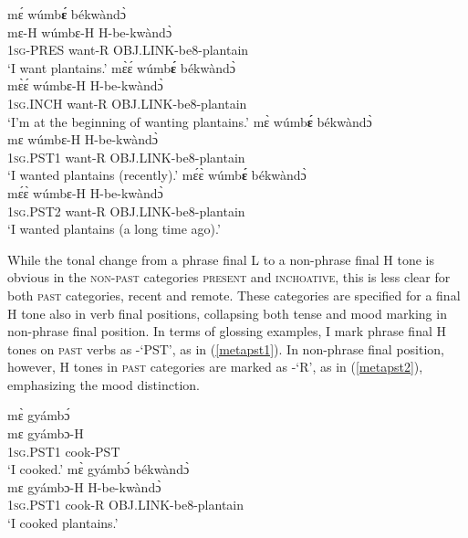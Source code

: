 \begin{exe}
\ex\label{M}
\begin{xlist}
\ex \label{M1}
  \glll  mɛ́ wúmb{\bfseries ɛ́} békwàndɔ̀ \\
          mɛ-H wúmbɛ-H H-be-kwàndɔ̀\\
         1\textsc{sg}-PRES want-R OBJ.LINK-be8-plantain  \\
    \trans `I want plantains.'
\ex\label{M2}
  \glll   mɛ̀ɛ́ wúmb{\bfseries ɛ́} békwàndɔ̀ \\
        mɛ̀ɛ́ wúmbɛ-H H-be-kwàndɔ̀ \\
          1\textsc{sg}.INCH want-R OBJ.LINK-be8-plantain  \\
    \trans `I'm at the beginning of wanting plantains.'
\ex\label{M3}
  \glll   mɛ̀ wúmb{\bfseries ɛ́} békwàndɔ̀ \\
         mɛ wúmbɛ-H H-be-kwàndɔ̀ \\
          1\textsc{sg}.PST1 want-R OBJ.LINK-be8-plantain  \\
    \trans `I wanted plantains (recently).'
\ex\label{M4}
  \glll   mɛ́ɛ̀ wúmb{\bfseries ɛ́} békwàndɔ̀ \\
          mɛ́ɛ̀ wúmbɛ-H H-be-kwàndɔ̀ \\
          1\textsc{sg}.PST2 want-R OBJ.LINK-be8-plantain  \\
    \trans `I wanted plantains (a long time ago).'
\end{xlist}
\end{exe}

While the tonal change from a phrase final L to a non-phrase final H tone is obvious in the \textsc{non-past} categories \textsc{present} and \textsc{inchoative}, this is less clear for both \textsc{past} categories, recent and remote. These categories are specified for a final H tone also in verb final positions, collapsing both tense and mood marking in non-phrase final position.  In terms of glossing examples, I mark phrase final H tones on \textsc{past} verbs as -`PST', as in (\ref{metapst1}). In  non-phrase final position, however, H tones in \textsc{past} categories are marked as -`R', as in (\ref{metapst2}), emphasizing the mood distinction.

\begin{exe}
\ex\label{metapst}
\begin{xlist}
\ex \label{metapst1}
  \glll  mɛ̀ gyámbɔ́  \\
          mɛ gyámbɔ-H \\
         1\textsc{sg}.PST1 cook-PST  \\
    \trans `I cooked.'
\ex\label{metapst2}
  \glll   mɛ̀ gyámbɔ́ békwàndɔ̀ \\
        mɛ gyámbɔ-H H-be-kwàndɔ̀ \\
          1\textsc{sg}.PST1 cook-R OBJ.LINK-be8-plantain  \\
    \trans `I cooked plantains.'
\end{xlist}
\end{exe}

